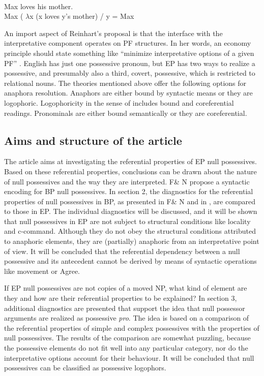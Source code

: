 \documentclass[output=paper]{langsci/langscibook}
\begin{document}
\ea%
    \citep[186]{Reinhart2006}\\\label{ex:wein:13}
    Max loves his mother.\\
    Max ( $\lambda $x (x loves y’s mother) / y = Max\\
\z

An import aspect of Reinhart’s proposal is that the interface with the interpretative component operates on PF structures. In her words, an economy principle should state something like “minimize interpretative options of a given PF” \citep[103]{Reinhart2006}. English has just one possessive pronoun, but EP has two ways to realize a possessive, and presumably also a third, covert, possessive, which is restricted to relational nouns. The theories mentioned above offer the following options for anaphora resolution. Anaphors are either bound by syntactic means or they are logophoric. Logophoricity in the sense of \citet{Reuland2011} includes bound and coreferential readings. Pronominals are either bound semantically or they are coreferential.

\subsection{Aims and structure of the article}%

The article aims at investigating the referential properties of EP null possessives. Based on these referential properties, conclusions can be drawn about the nature of null possessives and the way they are interpreted. F\& N propose a syntactic encoding for BP null possessives. In section 2, the diagnostics for the referential properties of null possessives in BP, as presented in F\& N and in \citet{Rodrigues2010}, are compared to those in EP. The individual diagnostics will be discussed, and it will be shown that null possessives in EP are not subject to structural conditions like locality and c-command. Although they do not obey the structural conditions attributed to anaphoric elements, they are (partially) anaphoric from an interpretative point of view. It will be concluded that the referential dependency between a null possessive and its antecedent cannot be derived by means of syntactic operations like movement or Agree.

If EP null possessives are not copies of a moved NP, what kind of element are they and how are their referential properties to be explained? In section 3, additional diagnostics are presented that support the idea that null possessor arguments are realized as possessive \textit{pro}. The idea is based on a comparison of the referential properties of simple and complex possessives with the properties of null possessives. The results of the comparison are somewhat puzzling, because the possessive elements do not fit well into any particular category, nor do the interpretative options account for their behaviour. It will be concluded that null possessives can be classified as possessive logophors.
\end{document}
